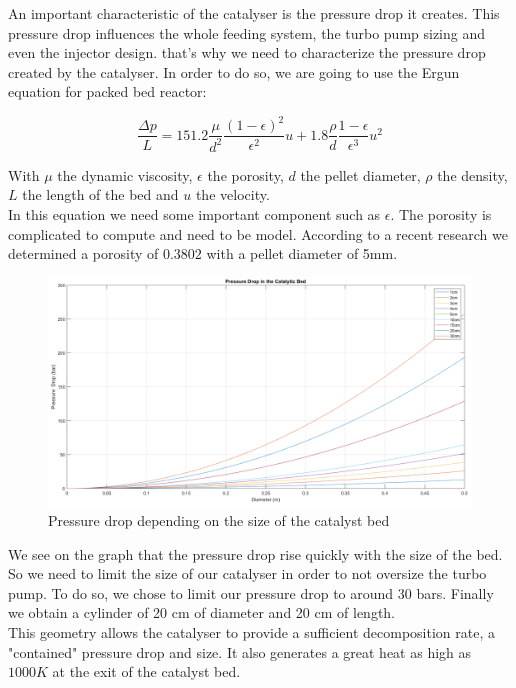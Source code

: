 An important characteristic of the catalyser is the pressure drop it creates. This pressure drop influences the whole feeding system, the turbo pump sizing and even the injector design. that's why we need to characterize the pressure drop created by the catalyser. In order to do so, we are going to use the Ergun equation for packed bed reactor:

$$
\frac{\Delta p}{L} = 151.2 \frac{\mu}{d^2}\frac{(1-\epsilon)^2}{\epsilon^2}u + 1.8 \frac{\rho}{d}\frac{1- \epsilon}{\epsilon^3}u^2
$$

With $\mu$ the dynamic viscosity, $\epsilon$ the porosity, $d$ the pellet diameter, $\rho$ the density, $L$ the length of the bed and $u$ the velocity. \\

In this equation we need some important component such as $\epsilon$. The porosity is complicated to compute and need to be model. According to a recent research we determined a porosity of $0.3802$ with a pellet diameter of 5mm.

\begin{figure}[H]
	\centering
	\includegraphics[width=\linewidth]{pressuredrop}
	\caption{Pressure drop depending on the size of the catalyst bed}
\end{figure}

We see on the graph that the pressure drop rise quickly with the size of the bed. So we need to limit the size of our catalyser in order to not oversize the turbo pump. To do so, we chose to limit our pressure drop to around 30 bars. Finally we obtain a cylinder of 20 cm of diameter and 20 cm of length. \\

This geometry allows the catalyser to provide a sufficient decomposition rate, a "contained" pressure drop and size. It also generates a great heat as high as $1000K$ at the exit of the catalyst bed. 


